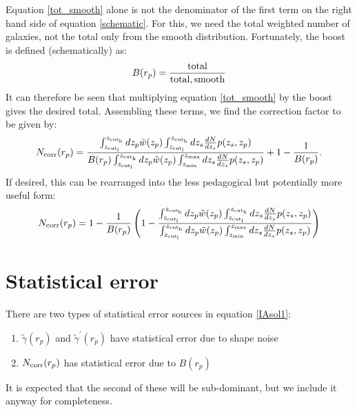 \documentclass[onecolumn,amsmath,aps,fleqn, superscriptaddress]{revtex4}
\begin{document}
Equation \ref{tot_smooth} alone is not the denominator of the first term on the right hand side of equation \ref{schematic}. For this, we need the total weighted number of galaxies, not the total only from the smooth distribution. Fortunately, the boost is defined (schematically) as:
\begin{equation}
B(r_p) = \frac{ {\rm total}}{{\rm total, smooth}}
\label{boost_schm}
\end{equation}
It can therefore be seen that multiplying equation \ref{tot_smooth} by the boost gives the desired total. Assembling these terms, we find the correction factor to be given by:
\begin{equation}
N_{\rm corr}(r_p) = \frac{\int_{z_{\rm cut_l}}^{z_{\rm cut_h}} dz_p \tilde{w}(z_p) \int_{z_{\rm cut_l}}^{z_{\rm cut_h}} dz_s\frac{dN}{dz_s} p(z_s, z_p)}{B(r_p) \int_{z_{\rm cut_l}}^{z_{\rm cut_h}} dz_p  \tilde{w}(z_p) \int_{z_{\rm min}}^{z_{\rm max}} dz_s\frac{dN}{dz_s} p(z_s, z_p)} +1 - \frac{1}{B(r_p)}.
\label{Ncorr}
\end{equation}
If desired, this can be rearranged into the less pedagogical but potentially more useful form:
\begin{equation}
N_{\rm corr}(r_p) = 1 - \frac{1}{B(r_p)}\left(1 - \frac{\int_{z_{\rm cut_l}}^{z_{\rm cut_h}} dz_p \tilde{w}(z_p) \int_{z_{\rm cut_l}}^{z_{\rm cut_h}} dz_s\frac{dN}{dz_s} p(z_s, z_p)}{\int_{z_{\rm cut_l}}^{z_{\rm cut_h}} dz_p  \tilde{w}(z_p) \int_{z_{\rm min}}^{z_{\rm max}} dz_s\frac{dN}{dz_s} p(z_s, z_p)} \right)
\label{ncorr_2}
\end{equation}

\section*{Statistical error}

There are two types of statistical error sources in equation \ref{IAsol1}: 
\begin{enumerate}
\item{$\tilde{\gamma}(r_p)$ and $\tilde{\gamma}^\prime(r_p)$ have statistical error due to shape noise}
\item{$N_{\rm corr}(r_p)$ has statistical error due to $B(r_p)$}
\end{enumerate}
It is expected that the second of these will be sub-dominant, but we include it anyway for completeness. 
\end{document}
